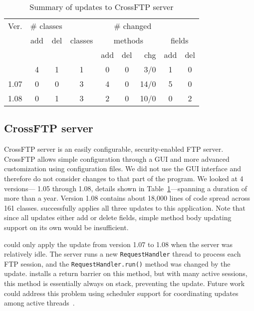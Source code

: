 \begin{table}[t]
\begin{footnotesize}
\begin{center}
\begin{tabular}{|l||c|c||c|c|c|r|c|c|} \hline \T
Ver.   & \multicolumn{2}{c||}{\# classes} &    \multicolumn{6}{c|}{\# changed}             \\
       & add & del & classes & \multicolumn{3}{c|}{methods} & \multicolumn{2}{c|}{fields}  \\
       &     &     &         & add & del & chg   & add & del                               \\ \hline \hline \T
1.06   & 4   & 1   & 1       & 0   & 0   & 3/0   & 1   & 0                                 \\
1.07   & 0   & 0   & 3       & 4   & 0   & 14/0  & 5   & 0                                 \\
1.08   & 0   & 1   & 3       & 2   & 0   & 10/0  & 0   & 2                                 \\ \hline
\end{tabular}
\end{center}
\end{footnotesize}
\caption{Summary of updates to CrossFTP server}
\label{tab:crossftp-changes}
\end{table}

\subsection{CrossFTP server}
\label{subsec:crossftp}
CrossFTP server is an easily configurable, security-enabled FTP server.
CrossFTP allows simple configuration through a GUI and more advanced
customization using configuration files. We did not use the GUI interface
and therefore do not consider changes to that part of the program.  We
looked at 4 versions--- 1.05 through 1.08, details shown in Table~\ref{tab:crossftp-changes}---spanning a duration of more
than a year. Version 1.08 contains about 18,000 lines of code spread across
161 classes. \DSU{} successfully applies all three updates to this
application.  Note that since all updates either add or delete fields,
simple method body updating support on its own would be insufficient.

\DSU{} could only apply the update from version 1.07 to 1.08 when the
server was relatively idle.
The server runs a new {\tt RequestHandler} thread to process each FTP
session, and the \texttt{RequestHandler.run()} method was changed by
the update.   \DSU{} installs a return barrier on this method,
but with many active sessions, this method is essentially always on stack,
preventing the update.  Future work could address this problem using scheduler support
for coordinating updates among active threads~\cite{neamtiu09stump}.
